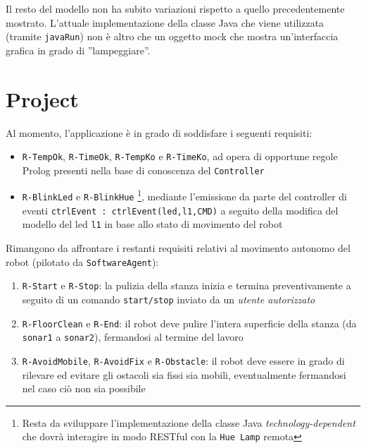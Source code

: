 \documentclass{../llncs}
\newcommand{\codescript}[1]{{\mbox{\small{\texttt{#1}}}}\xspace}
\newcommand{\code}[1]{{\color{blue}\small{\texttt{#1}}}}
\newcommand{\labelsec}[1]{\label{sec:#1}}
\begin{document}


Il resto del modello non ha subito variazioni rispetto a quello precedentemente mostrato. L'attuale implementazione della classe Java che viene utilizzata (tramite \codescript{javaRun}) non è altro che un oggetto mock che mostra un'interfaccia grafica in grado di ''lampeggiare''.

\section{Project}
\labelsec{Project}
Al momento, l'applicazione è in grado di soddisfare i seguenti requisiti:
\begin{itemize}
\item \code{R-TempOk}, \code{R-TimeOk}, \code{R-TempKo} e \code{R-TimeKo}, ad opera di opportune regole Prolog presenti nella base di conoscenza del \texttt{Controller}
\item \code{R-BlinkLed} e \code{R-BlinkHue}
\footnote{Resta da sviluppare l'implementazione della classe Java \emph{technology-dependent} che dovrà interagire in modo RESTful con la \texttt{Hue Lamp} remota}, mediante l'emissione da parte del controller di eventi \codescript{ctrlEvent : ctrlEvent(led,l1,CMD)} a seguito della modifica del modello del led \codescript{l1} in base allo stato di movimento del robot
\end{itemize}

Rimangono da affrontare i restanti requisiti relativi al movimento autonomo del robot (pilotato da \texttt{SoftwareAgent}):
\begin{enumerate}
\item \code{R-Start} e \code{R-Stop}: la pulizia della stanza inizia e termina preventivamente a seguito di un comando \texttt{start/stop} inviato da un \emph{utente autorizzato}
\item \code{R-FloorClean} e \code{R-End}: il robot deve pulire l'intera superficie della stanza (da \code{sonar1} a \code{sonar2}), fermandosi al termine del lavoro
\item \code{R-AvoidMobile}, \code{R-AvoidFix} e \code{R-Obstacle}: il robot deve essere in grado di rilevare ed evitare gli ostacoli sia fissi sia mobili, eventualmente fermandosi nel caso ciò non sia possibile
\end{enumerate}
\end{document}
